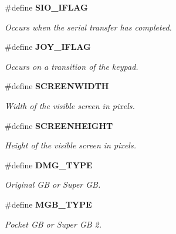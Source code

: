 \begin{CompactItemize}
\item 
\label{gb.h_a20}
\#define {\bf SIO\_\-IFLAG}
\begin{CompactList}\small\item\em Occurs when the serial transfer has completed.\item\end{CompactList}

\item 
\label{gb.h_a21}
\#define {\bf JOY\_\-IFLAG}
\begin{CompactList}\small\item\em Occurs on a transition of the keypad.\item\end{CompactList}

\item 
\label{gb.h_a22}
\#define {\bf SCREENWIDTH}
\begin{CompactList}\small\item\em Width of the visible screen in pixels.\item\end{CompactList}

\item 
\label{gb.h_a23}
\#define {\bf SCREENHEIGHT}
\begin{CompactList}\small\item\em Height of the visible screen in pixels.\item\end{CompactList}

\item 
\label{gb.h_a28}
\#define {\bf DMG\_\-TYPE}
\begin{CompactList}\small\item\em Original GB or Super GB.\item\end{CompactList}

\item 
\label{gb.h_a29}
\#define {\bf MGB\_\-TYPE}
\begin{CompactList}\small\item\em Pocket GB or Super GB 2.\item\end{CompactList}


\end{CompactItemize}
